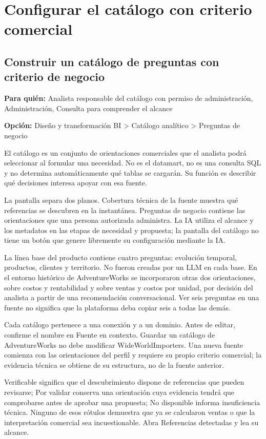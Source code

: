 \chapter{Configurar el catálogo con criterio comercial}
\section{Construir un catálogo de preguntas con criterio de negocio}
\label{unidad:operacion_13}
\textbf{Para quién:} Analista responsable del catálogo con permiso de administración, Administración, Consulta para comprender el alcance\par
\textbf{Opción:} Diseño y transformación BI > Catálogo analítico > Preguntas de negocio\par

El catálogo es un conjunto de orientaciones comerciales que el analista podrá seleccionar al formular una necesidad. No es el datamart, no es una consulta SQL y no determina automáticamente qué tablas se cargarán. Su función es describir qué decisiones interesa apoyar con esa fuente.

La pantalla separa dos planos. Cobertura técnica de la fuente muestra qué referencias se descubren en la instantánea. Preguntas de negocio contiene las orientaciones que una persona autorizada administra. La IA utiliza el alcance y los metadatos en las etapas de necesidad y propuesta; la pantalla del catálogo no tiene un botón que genere libremente su configuración mediante la IA.

La línea base del producto contiene cuatro preguntas: evolución temporal, productos, clientes y territorio. No fueron creadas por un LLM en cada base. En el entorno histórico de AdventureWorks se incorporaron otras dos orientaciones, sobre costos y rentabilidad y sobre ventas y costos por unidad, por decisión del analista a partir de una recomendación conversacional. Ver seis preguntas en una fuente no significa que la plataforma deba copiar seis a todas las demás.

Cada catálogo pertenece a una conexión y a un dominio. Antes de editar, confirme el nombre en Fuente en contexto. Guardar un catálogo de AdventureWorks no debe modificar WideWorldImporters. Una nueva fuente comienza con las orientaciones del perfil y requiere su propio criterio comercial; la evidencia técnica se obtiene de su estructura, no de la fuente anterior.

Verificable significa que el descubrimiento dispone de referencias que pueden revisarse; Por validar conserva una orientación cuya evidencia tendrá que comprobarse antes de aprobar una propuesta; No disponible informa insuficiencia técnica. Ninguno de esos rótulos demuestra que ya se calcularon ventas o que la interpretación comercial sea incuestionable. Abra Referencias detectadas y lea su alcance.

